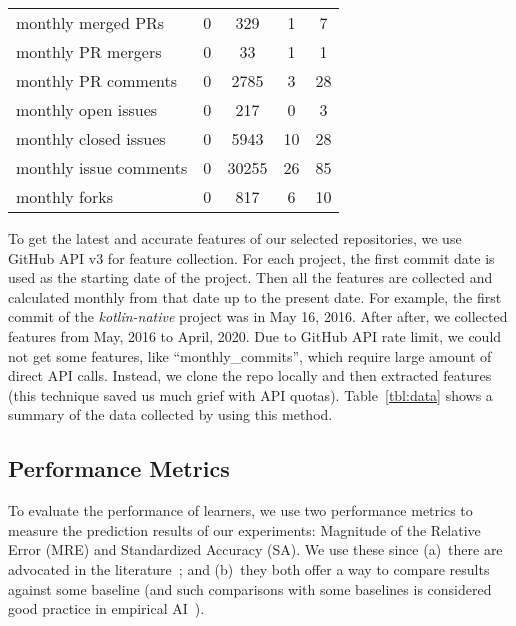 \documentclass[sigconf,anonymous,review]{acmart}
\begin{document}
\begin{table}[!t]
\begin{adjustbox}{max width=0.42\textwidth}
\begin{tabular}{l|cccc}
{\color[HTML]{000000} monthly merged PRs} & {\color[HTML]{000000} 0} & {\color[HTML]{000000} 329} & {\color[HTML]{000000} 1} & {\color[HTML]{000000} 7} \\
\rowcolor[HTML]{FFFFFF} 
{\color[HTML]{000000} monthly PR mergers} & {\color[HTML]{000000} 0} & {\color[HTML]{000000} 33} & {\color[HTML]{000000} 1} & {\color[HTML]{000000} 1} \\
\rowcolor[HTML]{F3F3F3} 
{\color[HTML]{000000} monthly PR comments} & {\color[HTML]{000000} 0} & {\color[HTML]{000000} 2785} & {\color[HTML]{000000} 3} & {\color[HTML]{000000} 28} \\
\rowcolor[HTML]{FFFFFF} 
{\color[HTML]{000000} monthly open issues} & {\color[HTML]{000000} 0} & {\color[HTML]{000000} 217} & {\color[HTML]{000000} 0} & {\color[HTML]{000000} 3} \\
\rowcolor[HTML]{F3F3F3} 
{\color[HTML]{000000} monthly closed issues} & {\color[HTML]{000000} 0} & {\color[HTML]{000000} 5943} & {\color[HTML]{000000} 10} & {\color[HTML]{000000} 28} \\
\rowcolor[HTML]{FFFFFF} 
{\color[HTML]{000000} monthly issue comments} & {\color[HTML]{000000} 0} & {\color[HTML]{000000} 30255} & {\color[HTML]{000000} 26} & {\color[HTML]{000000} 85} \\
\rowcolor[HTML]{F3F3F3} 
{\color[HTML]{000000} monthly forks} & {\color[HTML]{000000} 0} & {\color[HTML]{000000} 817} & {\color[HTML]{000000} 6} & {\color[HTML]{000000} 10}
\end{tabular}
\end{adjustbox}
\end{table}



To get the latest and accurate features
of our selected repositories,  we use GitHub API v3 for feature collection. For each project, the first commit date is
used as the starting date of the project. Then all the features are collected and calculated monthly
from that date up to the present date. For example, the first commit of
the {\it kotlin-native} project was in May 16,  2016.
After after, we collected  features from May, 2016 to April, 2020. Due to GitHub API rate limit, we could not get some features, like ``monthly\_commits'', which require large amount of direct API calls. Instead, we clone the repo locally and then extracted   features (this technique saved us much grief with API  quotas). 
Table~\ref{tbl:data} shows a summary of the data collected by using this method. 


\subsection{Performance Metrics}
To evaluate the performance of learners, we use two performance metrics to measure the prediction results of our experiments: Magnitude of the Relative Error (MRE) and Standardized Accuracy (SA). We use these since (a)~there are advocated in the literature~\cite{shepperd2012evaluating,sarro2016multi}; and (b)~they both offer a way to compare results against some baseline
(and such  comparisons with some baselines is considered good practice in empirical AI~\cite{Cohen95}).
\end{document}
